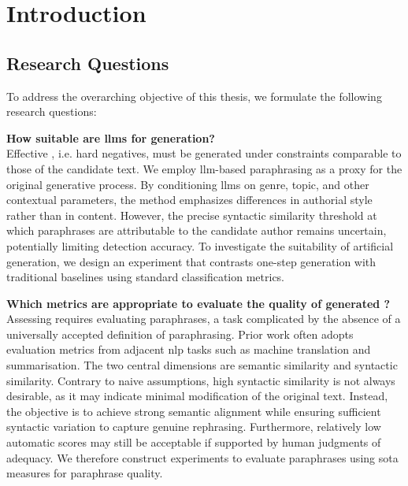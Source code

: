 \chapter{Introduction}
\label{chap:introduction}



\section{Research Questions}
\label{sec:research_questions}
To address the overarching objective of this thesis, we formulate the following research questions:
\begin{questions}
    \item \textbf{How suitable are \acp{llm} for \imp{} generation?} \label{enum:rq1} \hfill \\
    Effective \imps{}, i.e. hard negatives, must be generated under constraints comparable to those of the candidate text. 
    We employ \ac{llm}-based paraphrasing as a proxy for the original generative process. 
    By conditioning \acp{llm} on genre, topic, and other contextual parameters, the \imp{} method emphasizes differences in authorial style rather than in content. 
    However, the precise syntactic similarity threshold at which paraphrases are attributable to the candidate author remains uncertain, potentially limiting detection accuracy. 
    To investigate the suitability of artificial \imp{} generation, we design an experiment that contrasts one-step \imp{} generation with traditional baselines using standard classification metrics.

    \item \textbf{Which metrics are appropriate to evaluate the quality of generated \imps{}?} \label{enum:rq2} \hfill \\
    Assessing \imps{} requires evaluating paraphrases, a task complicated by the absence of a universally accepted definition of paraphrasing. 
    Prior work often adopts evaluation metrics from adjacent \ac{nlp} tasks such as machine translation and summarisation. 
    The two central dimensions are semantic similarity and syntactic similarity. 
    Contrary to naive assumptions, high syntactic similarity is not always desirable, as it may indicate minimal modification of the original text.
    Instead, the objective is to achieve strong semantic alignment while ensuring sufficient syntactic variation to capture genuine rephrasing. 
    Furthermore, relatively low automatic scores may still be acceptable if supported by human judgments of adequacy. 
    We therefore construct experiments to evaluate paraphrases using \acl{sota} measures for paraphrase quality. 


\end{questions}
